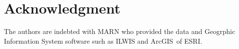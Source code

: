 \documentclass[11pt,twoside]{rmta2010esp}%
\begin{document}

%


\section{Acknowledgment}   
The authors are indebted with MARN who provided the data and Geogrphic Information System software such as ILWIS and ArcGIS\textregistered \  of ESRI.
\end{document}
